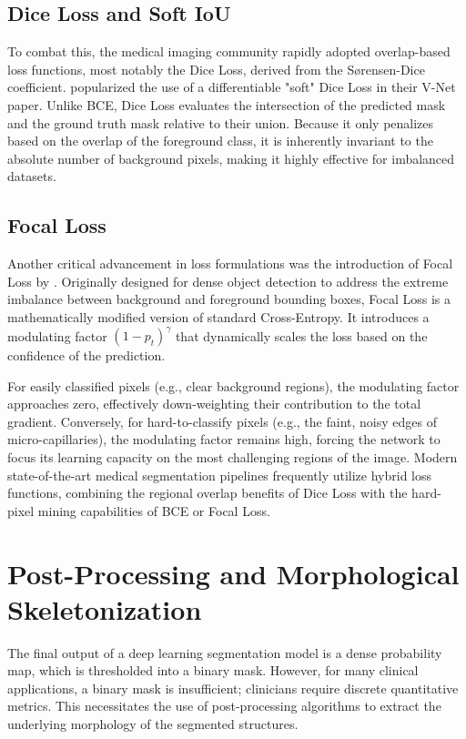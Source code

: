 \subsection{Dice Loss and Soft IoU}
To combat this, the medical imaging community rapidly adopted overlap-based loss functions, most notably the Dice Loss, derived from the Sørensen-Dice coefficient. \textcite{milletari2016v} popularized the use of a differentiable "soft" Dice Loss in their V-Net paper. Unlike BCE, Dice Loss evaluates the intersection of the predicted mask and the ground truth mask relative to their union. Because it only penalizes based on the overlap of the foreground class, it is inherently invariant to the absolute number of background pixels, making it highly effective for imbalanced datasets.

\subsection{Focal Loss}
Another critical advancement in loss formulations was the introduction of Focal Loss by \textcite{lin2017focal}. Originally designed for dense object detection to address the extreme imbalance between background and foreground bounding boxes, Focal Loss is a mathematically modified version of standard Cross-Entropy. It introduces a modulating factor $(1 - p_t)^\gamma$ that dynamically scales the loss based on the confidence of the prediction. 

For easily classified pixels (e.g., clear background regions), the modulating factor approaches zero, effectively down-weighting their contribution to the total gradient. Conversely, for hard-to-classify pixels (e.g., the faint, noisy edges of micro-capillaries), the modulating factor remains high, forcing the network to focus its learning capacity on the most challenging regions of the image. Modern state-of-the-art medical segmentation pipelines frequently utilize hybrid loss functions, combining the regional overlap benefits of Dice Loss with the hard-pixel mining capabilities of BCE or Focal Loss.

\section{Post-Processing and Morphological Skeletonization}
The final output of a deep learning segmentation model is a dense probability map, which is thresholded into a binary mask. However, for many clinical applications, a binary mask is insufficient; clinicians require discrete quantitative metrics. This necessitates the use of post-processing algorithms to extract the underlying morphology of the segmented structures.

